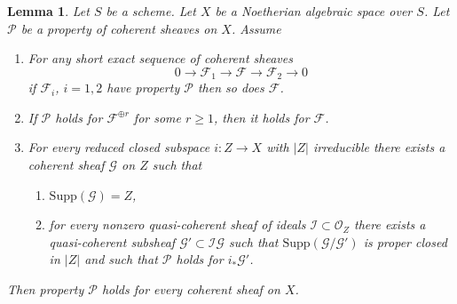 \documentclass{stacks-project}
\theoremstyle{plain}
\newtheorem{lemma}[subsection]{Lemma}
\theoremstyle{definition}
\theoremstyle{remark}
\numberwithin{equation}{subsection}
\begin{document}
\begin{lemma}
\label{lemma-property-higher-rank-cohomological}
Let $S$ be a scheme. Let $X$ be a Noetherian algebraic space over $S$.
Let $\mathcal{P}$ be a property of coherent sheaves on $X$. Assume
\begin{enumerate}
\item For any short exact sequence of coherent sheaves
$$
0 \to \mathcal{F}_1 \to \mathcal{F} \to \mathcal{F}_2 \to 0
$$
if $\mathcal{F}_i$, $i = 1, 2$ have property $\mathcal{P}$
then so does $\mathcal{F}$.
\item If $\mathcal{P}$ holds for $\mathcal{F}^{\oplus r}$ for
some $r \geq 1$, then it holds for $\mathcal{F}$.
\item For every reduced closed subspace $i : Z \to X$ with
$|Z|$ irreducible there exists a coherent sheaf $\mathcal{G}$ on $Z$
such that
\begin{enumerate}
\item $\text{Supp}(\mathcal{G}) = Z$,
\item for every nonzero quasi-coherent sheaf of ideals
$\mathcal{I} \subset \mathcal{O}_Z$ there exists a quasi-coherent
subsheaf $\mathcal{G}' \subset \mathcal{I}\mathcal{G}$ such that
$\text{Supp}(\mathcal{G}/\mathcal{G}')$ is proper closed in $|Z|$
and such that $\mathcal{P}$ holds for $i_*\mathcal{G}'$.
\end{enumerate}
\end{enumerate}
Then property $\mathcal{P}$ holds for every coherent sheaf on $X$.
\end{lemma}
\end{document}
